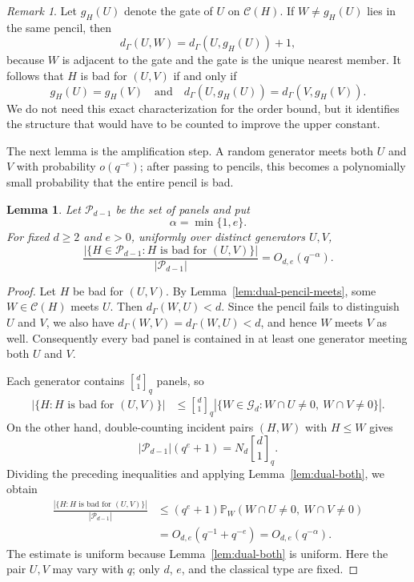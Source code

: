 \documentclass[11pt]{article}
\newtheorem{lemma}[theorem]{Lemma}
\theoremstyle{definition}
\theoremstyle{remark}
\newtheorem{remark}[theorem]{Remark}
\newcommand{\Prob}{\mathbb P}
\newcommand{\qbinom}[2]{\genfrac{[}{]}{0pt}{}{#1}{#2}_q}
\begin{document}
\begin{remark}\label{rem:dual-gates}
Let $g_H(U)$ denote the gate of $U$ on $\mathcal C(H)$.  If
$W\neq g_H(U)$ lies in the same pencil, then
\[
        d_\Gamma(U,W)=d_\Gamma(U,g_H(U))+1,
\]
because $W$ is adjacent to the gate and the gate is the unique nearest
member.  It follows that $H$ is bad for $(U,V)$ if and only if
\[
        g_H(U)=g_H(V)
        \quad\text{and}\quad
        d_\Gamma(U,g_H(U))=d_\Gamma(V,g_H(V)).
\]
We do not need this exact characterization for the order bound, but it
identifies the structure that would have to be counted to improve the 
upper
constant.
\end{remark}

The next lemma is the amplification step.  A random generator meets both
$U$ and $V$ with probability $o(q^{-e})$; after passing to pencils, this
becomes a polynomially small probability that the entire pencil is bad.

\begin{lemma}\label{lem:dual-bad-panel}
Let $\mathcal P_{d-1}$ be the set of panels and put
\[
        \alpha=\min\{1,e\}.
\]
For fixed $d\geq2$ and $e>0$, uniformly over distinct generators $U,V$,
\[
 \frac{|\{H\in\mathcal P_{d-1}:H\text{ is bad for }(U,V)\}|}
      {|\mathcal P_{d-1}|}
 =O_{d,e}(q^{-\alpha}).
\]
\end{lemma}

\begin{proof}
Let $H$ be bad for $(U,V)$.  By Lemma~\ref{lem:dual-pencil-meets}, some
$W\in\mathcal C(H)$ meets $U$.  Then $d_\Gamma(W,U)<d$.  Since the pencil
fails to distinguish $U$ and $V$, we also have
$d_\Gamma(W,V)=d_\Gamma(W,U)<d$, and hence $W$ meets $V$ as well.
Consequently every bad panel is contained in at least one generator 
meeting
both $U$ and $V$.

Each generator contains $\qbinom d1$ panels, so
\[
\begin{aligned}
 |\{H:H\text{ is bad for }(U,V)\}|
 &\leq
 \qbinom d1
 |\{W\in\mathcal G_d:W\cap U\neq0,\ W\cap V\neq0\}|.
\end{aligned}
\]
On the other hand, double-counting incident pairs $(H,W)$ with $H\leq W$
gives
\[
        |\mathcal P_{d-1}|(q^e+1)
        =N_d\qbinom d1.
\]
Dividing the preceding inequalities and applying
Lemma~\ref{lem:dual-both}, we obtain
\[
\begin{aligned}
 \frac{|\{H:H\text{ is bad for }(U,V)\}|}{|\mathcal P_{d-1}|}
 &\leq
 (q^e+1)
 \Prob_W(W\cap U\neq0,\ W\cap V\neq0)\\
 &=O_{d,e}(q^{-1}+q^{-e})
 =O_{d,e}(q^{-\alpha}).
\end{aligned}
\]
The estimate is uniform because Lemma~\ref{lem:dual-both} is uniform.
Here the pair $U,V$ may vary with $q$; only $d$, $e$, and the classical
type are fixed.
\end{proof}
\end{document}
